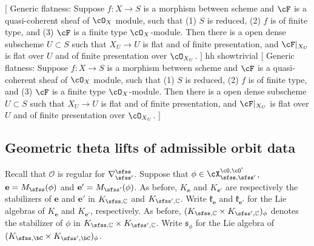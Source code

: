 \documentclass[12pt,a4paper]{amsart}
\newcommand{\trivial}[2][]{\if\relax\detokenize{#1}\relax
  {%
      \color{orange} \vspace{0em} $[$  #2 $]$
      \color{black}
  }
  \else
\ifx#1h
\ifcsname showtrivial\endcsname
{%
    \color{orange} \vspace{0em}  $[$ #2 $]$
    \color{black}
}
\fi
\else {\red Wrong argument!} \fi
\fi
}
\newcommand{\CO}{{\mathcal {O}}}
\numberwithin{equation}{section}
\theoremstyle{remark}
\def\UU{\rU}
\def\bcOp{\overline{\cO'}}
\def\cOp{\cO^{\prime}}
\begin{document}
\trivial[h]{
  Generic flatness: Suppose $f: X\rightarrow S $ is a morphism between scheme
  and $\cF$ is a quasi-coherent sheaf of $\cO_{X}$ module, such that (1) $S$ is
  reduced, (2) $f$ is of finite type, and (3) $\cF$ is a finite type
  $\cO_{X}$-module.
Then there is a open dense subscheme $U\subset S$ such that
$X_{U}\rightarrow U $
is flat and of finite presentation, and $\cF|_{X_U}$ is flat over $U$
and of finite presentation over $\cO_{X_{U}}$.
}

\subsection{Geometric theta lifts of admissible orbit data}

\def\wedgetop{{\bigwedge}^{\mathrm{top}}}


\medskip

\def\dlift{{\check\vartheta}}
\def\AOD{\mathrm{AOD}}

Recall that  $\CO$ is regular for $\DDss$. Suppose that $\phi\in \CXOO$, $\mathbf e=M_\sfss(\phi)$ and $\mathbf e'=M_{\sfss'}(\phi)$. As before, $K_\mathbf e$ and $K_{\mathbf e'}$ are respectively the  stabilizers of $\mathbf e$ and $\mathbf e'$ in $K_{\sfss, \C}$ and $K_{\sfss', \C}$.  Write $\mathfrak k_{\mathbf e}$ and $\mathfrak k_{\mathbf e'}$ for the Lie algebras of $K_{\mathbf e}$ and $K_{\mathbf e'}$, respectively. As before, $(K_{\sfss, \C}\times K_{\sfss', \C})_{\ww}$ denotes the stabilizer of $\phi$ in $K_{\sfss, \C}\times K_{\sfss', \C}$.
   Write $\mathfrak s_\phi$ for the Lie algebra of  $(\Ks\times \Ksp)_{\ww}$.
\end{document}
